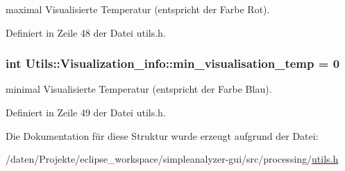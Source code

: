 maximal Visualisierte Temperatur (entspricht der Farbe Rot). 



Definiert in Zeile 48 der Datei utils.\-h.

\hypertarget{structUtils_1_1Visualization__info_a6e192352d1f00709f8ef963206ff2653}{
\subsubsection[{min\-\_\-visualisation\-\_\-temp}]{\setlength{\rightskip}{0pt plus 5cm}int Utils\-::\-Visualization\-\_\-info\-::min\-\_\-visualisation\-\_\-temp = 0}}\label{structUtils_1_1Visualization__info_a6e192352d1f00709f8ef963206ff2653}


minimal Visualisierte Temperatur (entspricht der Farbe Blau). 



Definiert in Zeile 49 der Datei utils.\-h.



Die Dokumentation für diese Struktur wurde erzeugt aufgrund der Datei\-:\begin{DoxyCompactItemize}
\item 
/daten/\-Projekte/eclipse\-\_\-workspace/simpleanalyzer-\/gui/src/processing/\hyperlink{utils_8h}{utils.\-h}\end{DoxyCompactItemize}
